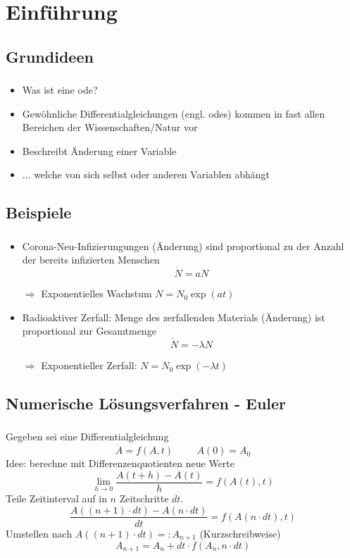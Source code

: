 \section{Einführung}
\label{sec:Introduction}


\subsection{Grundideen}
\label{subsec:basic-concepts}
\begin{frame}
    \frametitle{\insertsubsection}
    \begin{itemize}[<+->]
        \item Was ist eine \ac{ode}?
        \item Gewöhnliche Differentialgleichungen (engl. \acp{ode}) kommen in fast allen Bereichen der Wissenschaften/Natur vor
        \item Beschreibt Änderung einer Variable
        \item ... welche von sich selbst oder anderen Variablen abhängt
    \end{itemize}
\end{frame}


\subsection{Beispiele}
\label{subsec:examples}
\begin{frame}
    \frametitle{\insertsubsection}
    \begin{itemize}[<+->]
        \item Corona-Neu-Infizierungungen (Änderung) sind proportional zu der Anzahl der bereits infizierten Menschen
        \[\dot{N} = a N\]
        \item[$\Rightarrow$] Exponentielles Wachstum $N=N_0\exp(at)$
        \item Radioaktiver Zerfall: Menge des zerfallenden Materials (Änderung) ist proportional zur Gesamtmenge
        \[\dot{N} = -\lambda N\]
        \item[$\Rightarrow$] Exponentieller Zerfall: $N=N_0\exp(-\lambda t)$
    \end{itemize}
\end{frame}


\subsection{Numerische Lösungsverfahren - Euler}
\label{subsec:numerical-methods}
\begin{frame}
    \frametitle{\insertsubsection}
    Gegeben sei eine Differentialgleichung
    \[\dot{A} = f(A, t) \hspace{1cm} A(0) = A_0\]
    Idee: berechne mit Differenzenquotienten neue Werte
    \[\lim\limits_{h\rightarrow0}\frac{A(t + h) - A(t)}{h} = f(A(t), t)\]
    Teile Zeitinterval auf in $n$ Zeitschritte $dt$.
    \[\frac{A((n+1)\cdot dt) - A(n\cdot dt)}{dt} = f(A(n\cdot dt), t)\]
    Umstellen nach $A((n+1)\cdot dt)=:A_{n+1}$ (Kurzschreibweise)
    \[A_{n+1} = A_n + dt\cdot f(A_n, n\cdot dt)\]
\end{frame}


